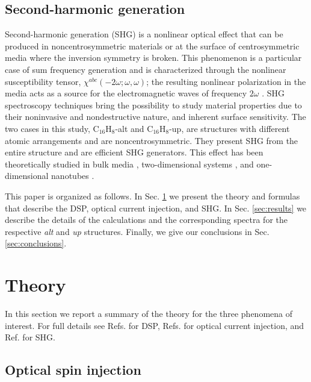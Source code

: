 \documentclass[pss]{wiley2sp} %
\begin{document}
\subsection{Second-harmonic generation}

Second-harmonic generation (SHG) is a nonlinear optical effect that can be
produced in noncentrosymmetric materials or at the surface of centrosymmetric
media where the inversion symmetry is broken. This phenomenon is a particular
case of sum frequency generation and is characterized through the nonlinear
susceptibility tensor, $\chi^{abc}(-2\omega;\omega,\omega)$; the resulting
nonlinear polarization in the media acts as a source for the electromagnetic
waves of frequency $2\omega$ \cite{loudonOUP00}. SHG spectroscopy techniques
bring the possibility to study material properties due to their noninvasive
and nondestructive nature, and inherent surface sensitivity. The two cases in
this study, C$_{16}$H$_{8}$-alt and C$_{16}$H$_{8}$-up, are structures with
different atomic arrangements and are noncentrosymmetric. They present SHG
from the entire structure and are efficient SHG generators. This effect has
been theoretically studied in bulk media \cite{andersonPRB15,figliozziPRL05},
two-dimensional systems \cite{mendozaPRB97,niAPL03}, and one-dimensional
nanotubes \cite{salazarPRB14,guoPRB05}.

This paper is organized as follows. In Sec. \ref{sec:theory} we present the
theory and formulas that describe the DSP, optical current injection, and SHG.
In Sec. \ref{sec:results} we describe the details of the calculations and the
corresponding spectra for the respective \emph{alt} and \emph{up} structures.
Finally, we give our conclusions in Sec. \ref{sec:conclusions}.


\section{Theory}\label{sec:theory}

In this section we report a summary of the theory for the three phenomena of
interest. For full details see Refs. \cite{nastosPRB07,mendozaPRB12} for DSP,
Refs. \cite{cabellosPRB11,sipePRB00} for optical current injection, and Ref.
\cite{andersonPRB15} for SHG. 


\subsection{Optical spin injection}\label{sec:theory-DSP}
\end{document}
